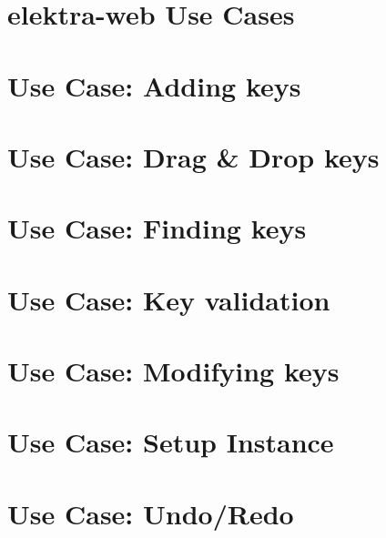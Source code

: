 \let\mypdfximage\pdfximage\def\pdfximage{\immediate\mypdfximage}\documentclass[twoside]{book}
\newcommand{\+}{\discretionary{\mbox{\scriptsize$\hookleftarrow$}}{}{}}
\begin{document}
\chapter{elektra-\/web Use Cases}
\label{doc_usecases_elektra_web_README_md}

\chapter{Use Case\+: Adding keys}
\label{doc_usecases_elektra_web_UC_adding_keys_md}

\chapter{Use Case\+: Drag \& Drop keys}
\label{doc_usecases_elektra_web_UC_drag_n_drop_md}

\chapter{Use Case\+: Finding keys}
\label{doc_usecases_elektra_web_UC_finding_keys_md}

\chapter{Use Case\+: Key validation}
\label{doc_usecases_elektra_web_UC_key_validation_md}

\chapter{Use Case\+: Modifying keys}
\label{doc_usecases_elektra_web_UC_modifying_keys_md}

\chapter{Use Case\+: Setup Instance}
\label{doc_usecases_elektra_web_UC_setup_instance_md}

\chapter{Use Case\+: Undo/\+Redo}
\label{doc_usecases_elektra_web_UC_undo_redo_md}

\end{document}
